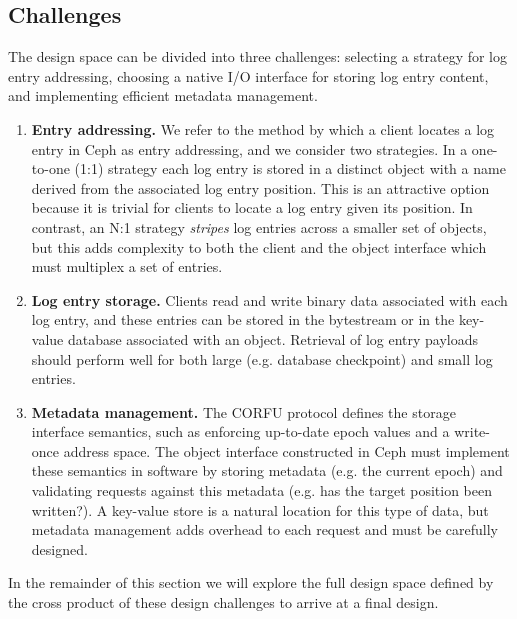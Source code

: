 \documentclass[10pt,twocolumn]{article}
\begin{document}
\subsection{Challenges}

The design space can be divided into three challenges: selecting a strategy
for log entry addressing, choosing a native I/O interface for storing log
entry content, and implementing efficient metadata management.

\begin{enumerate}
    \item {\bf Entry addressing.} We refer to the method by which a client
        locates a log entry in Ceph as entry addressing, and we consider two
        strategies. In a one-to-one (1:1) strategy each log entry is stored in
        a distinct object with a name derived from the associated log entry
        position. This is an attractive option because it is trivial for
        clients to locate a log entry given its position.  In contrast, an N:1
        strategy \emph{stripes} log entries across a smaller set of objects,
        but this adds complexity to both the client and the object interface which
        must multiplex a set of entries.

    \item {\bf Log entry storage.} Clients read and write binary data
        associated with each log entry, and these entries can be stored in the
        bytestream or in the key-value database associated with an object.
        Retrieval of log entry payloads should perform well for both large
        (e.g. database checkpoint) and small log entries.

    \item {\bf Metadata management.} The CORFU protocol defines the storage
        interface semantics, such as enforcing up-to-date epoch values and a
        write-once address space. The object interface constructed in Ceph must
        implement these semantics in software by storing metadata (e.g. the
        current epoch) and validating requests against this metadata (e.g. has
        the target position been written?). A key-value store is a natural
        location for this type of data, but metadata management adds overhead
        to each request and must be carefully designed.
\end{enumerate}

In the remainder of this section we will explore the full design space defined
by the cross product of these design challenges to arrive at a final design.
\end{document}
